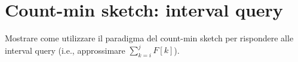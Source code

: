 \chapter{Count-min sketch: interval query}

\begin{problem*}
    Mostrare come utilizzare il paradigma del count-min sketch per rispondere alle
    interval query (i.e., approssimare \(\sum_{k=i}^j{F[k]}\)).
\end{problem*}

